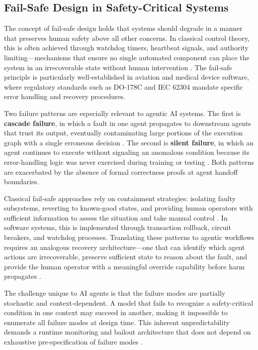 \subsection{Fail-Safe Design in Safety-Critical Systems}

The concept of fail-safe design holds that systems should degrade in a manner that preserves human safety above all other concerns. In classical control theory, this is often achieved through watchdog timers, heartbeat signals, and authority limiting—mechanisms that ensure no single automated component can place the system in an irrecoverable state without human intervention \cite{wiener1948}. The fail-safe principle is particularly well-established in aviation and medical device software, where regulatory standards such as DO-178C and IEC 62304 mandate specific error handling and recovery procedures.

Two failure patterns are especially relevant to agentic AI systems. The first is \textbf{cascade failure}, in which a fault in one agent propagates to downstream agents that trust its output, eventually contaminating large portions of the execution graph with a single erroneous decision \cite{tristr81}. The second is \textbf{silent failure}, in which an agent continues to execute without signaling an anomalous condition because its error-handling logic was never exercised during training or testing \cite{bansal2019}. Both patterns are exacerbated by the absence of formal correctness proofs at agent handoff boundaries.

Classical fail-safe approaches rely on containment strategies: isolating faulty subsystems, reverting to known-good states, and providing human operators with sufficient information to assess the situation and take manual control \cite{dijkstra1982}. In software systems, this is implemented through transaction rollback, circuit breakers, and watchdog processes. Translating these patterns to agentic workflows requires an analogous recovery architecture—one that can identify which agent actions are irrecoverable, preserve sufficient state to reason about the fault, and provide the human operator with a meaningful override capability before harm propagates \cite{wiener1948}.

The challenge unique to AI agents is that the failure modes are partially stochastic and context-dependent. A model that fails to recognize a safety-critical condition in one context may succeed in another, making it impossible to enumerate all failure modes at design time. This inherent unpredictability demands a runtime monitoring and bailout architecture that does not depend on exhaustive pre-specification of failure modes \cite{tristr81}.


